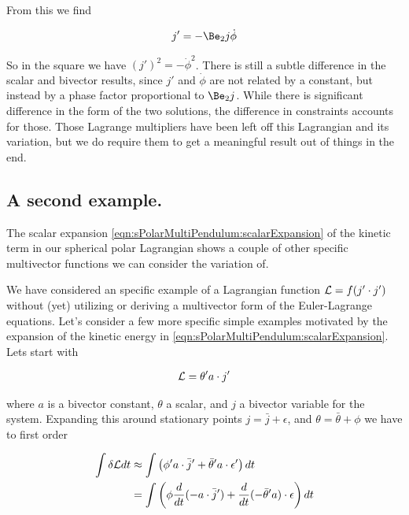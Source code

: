 From this we find

\begin{align*}
j'
&= -\Be_2 j \dot{\phi} \\
\end{align*}

So in the square we have $(j')^2 = -\dot{\phi}^2$.  There is still a subtle difference in the scalar and bivector results, since $j'$ and $\dot{\phi}$ are not related by a constant, but instead by a phase factor proportional to $\Be_2 j$.  While there is significant difference in the form of the two solutions, the difference in constraints accounts for those.  Those Lagrange multipliers have been left off this Lagrangian and its variation, but we do require them to get a meaningful result out of things in the end.

\subsection{A second example.}

The scalar expansion \ref{eqn:sPolarMultiPendulum:scalarExpansion} of the kinetic term in our spherical polar Lagrangian shows a couple of other specific multivector functions we can consider the variation of.

We have considered an specific example of a Lagrangian function $\mathcal{L} = f(j' \cdot j')$ without (yet) utilizing or deriving a multivector form of the Euler-Lagrange equations.  Let's consider a few more specific simple examples motivated by the expansion of the kinetic energy in \ref{eqn:sPolarMultiPendulum:scalarExpansion}.  Lets start with

\begin{align}\label{eqn:sPolarMultiPendulum:noo7}
\mathcal{L} = \theta' a \cdot j'
\end{align}

where $a$ is a bivector constant, $\theta$ a scalar, and $j$ a bivector variable for the system.  Expanding this around stationary points $j = \bar{j} + \epsilon$, and $\theta = \bar{\theta} + \phi$ we have to first order

\begin{align*}
\int \delta \mathcal{L} dt 
&\approx \int \left( \phi' a \cdot \bar{j}' + \bar{\theta}' a \cdot \epsilon' \right) dt \\
&= \int \left( \phi \frac{d}{dt}( - a \cdot \bar{j}' ) + \frac{d}{dt}( - \bar{\theta}' a ) \cdot \epsilon \right) dt \\
\end{align*}

